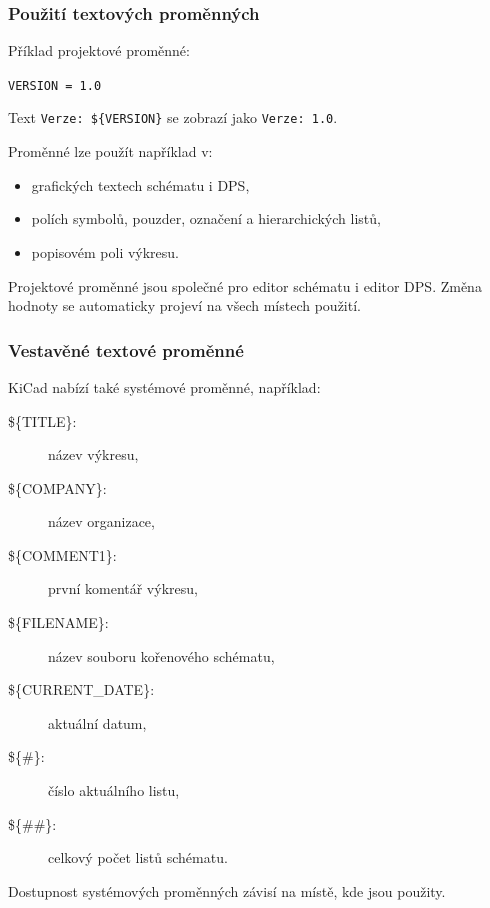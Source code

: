 \documentclass{beamer}
\begin{document}
\begin{frame}
	\frametitle{Použití textových proměnných}
	Příklad projektové proměnné:
	\begin{center}
		\texttt{VERSION = 1.0}
	\end{center}
	Text \texttt{Verze: \$\{VERSION\}} se zobrazí jako \texttt{Verze: 1.0}.

	\medskip
	Proměnné lze použít například v:
	\begin{itemize}
		\item grafických textech schématu i DPS,
		\item polích symbolů, pouzder, označení a hierarchických listů,
		\item popisovém poli výkresu.
	\end{itemize}

	\vfill
	Projektové proměnné jsou společné pro editor schématu i editor DPS. Změna hodnoty se automaticky projeví na všech místech použití.
\end{frame}

\begin{frame}
	\frametitle{Vestavěné textové proměnné}
	KiCad nabízí také systémové proměnné, například:
	\begin{description}
		\item[\$\{TITLE\}:] název výkresu,
		\item[\$\{COMPANY\}:] název organizace,
		\item[\$\{COMMENT1\}:] první komentář výkresu,
		\item[\$\{FILENAME\}:] název souboru kořenového schématu,
		\item[\$\{CURRENT\_DATE\}:] aktuální datum,
		\item[\$\{\#\}:] číslo aktuálního listu,
		\item[\$\{\#\#\}:] celkový počet listů schématu.
	\end{description}

	\vfill
	Dostupnost systémových proměnných závisí na místě, kde jsou použity.
\end{frame}

\end{document}
